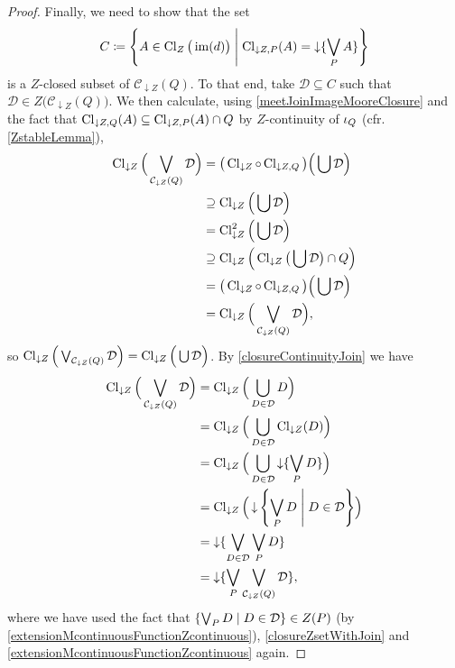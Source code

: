 \begin{proof}
Finally, we need to show that the set
\[ C \defeq \setbuilder{A\in \Closure_Z\big(\im(d)\big)}{\Closure_{\downarrow Z,P}(A) = \downset \{\bigvee_P A\}} \]
is a $Z$-closed subset of $\mathcal{C}_{\downarrow Z}(Q)$. To that end, take $\mathcal{D} \subseteq C$ such that $\mathcal{D}\in Z\big(\mathcal{C}_{\downarrow Z}(Q)\big)$. We then calculate, using \ref{meetJoinImageMooreClosure} and the fact that $\operatorname{Cl}_{\downarrow Z,Q}(A) \subseteq \operatorname{Cl}_{\downarrow Z,P}(A) \cap Q$ by $Z$-continuity of $\operatorname{\iota}_Q$ (cfr. \ref{ZstableLemma}),
\begin{align*}
\operatorname{Cl}_{\downarrow Z}\Big(\bigvee_{\mathcal{C}_{\downarrow Z}(Q)} \mathcal{D}\Big) &= \big(\operatorname{Cl}_{\downarrow Z}\circ \operatorname{Cl}_{\downarrow Z, Q}\big)\Big(\bigcup \mathcal{D}\Big) \\
&\supseteq \operatorname{Cl}_{\downarrow Z}\Big(\bigcup \mathcal{D}\Big) \\
&= \operatorname{Cl}_{\downarrow Z}^2\Big(\bigcup \mathcal{D}\Big) \\
&\supseteq \operatorname{Cl}_{\downarrow Z}\Big(\operatorname{Cl}_{\downarrow Z}\big(\bigcup \mathcal{D}\big) \cap Q\Big) \\
&= \big(\operatorname{Cl}_{\downarrow Z}\circ \operatorname{Cl}_{\downarrow Z,Q}\big)\Big(\bigcup \mathcal{D}\Big) \\
&= \operatorname{Cl}_{\downarrow Z}\Big(\bigvee_{\mathcal{C}_{\downarrow Z}(Q)} \mathcal{D}\Big),
\end{align*}
so $\operatorname{Cl}_{\downarrow Z}\Big(\bigvee_{\mathcal{C}_{\downarrow Z}(Q)} \mathcal{D}\Big) = \operatorname{Cl}_{\downarrow Z}\Big(\bigcup \mathcal{D}\Big)$.
By \ref{closureContinuityJoin} we have
\begin{align*}
\Closure_{\downarrow Z}\Big(\bigvee_{\mathcal{C}_{\downarrow Z}(Q)} \mathcal{D}\Big) &= \Closure_{\downarrow Z}\Big(\bigcup_{D\in \mathcal{D}} D\Big) \\
&= \Closure_{\downarrow Z}\Big(\bigcup_{D\in \mathcal{D}} \Closure_{\downarrow Z}(D)\Big) \\
&= \Closure_{\downarrow Z}\Big(\bigcup_{D\in \mathcal{D}} \downset \{\bigvee_P D\}\Big) \\
&= \Closure_{\downarrow Z}\Big(\downset \setbuilder{\bigvee_P D}{D\in \mathcal{D}}\Big) \\
&= \downset \{\bigvee_{D\in \mathcal{D}}\bigvee_P D\} \\
&= \downset \{\bigvee_P\bigvee_{\mathcal{C}_{\downarrow Z}(Q)}\mathcal{D} \},
\end{align*}
where we have used the fact that $\setbuilder{\bigvee_P D}{D\in \mathcal{D}} \in Z(P)$ (by \ref{extensionMcontinuousFunctionZcontinuous}), \ref{closureZsetWithJoin} and \ref{extensionMcontinuousFunctionZcontinuous} again.
\end{proof}

